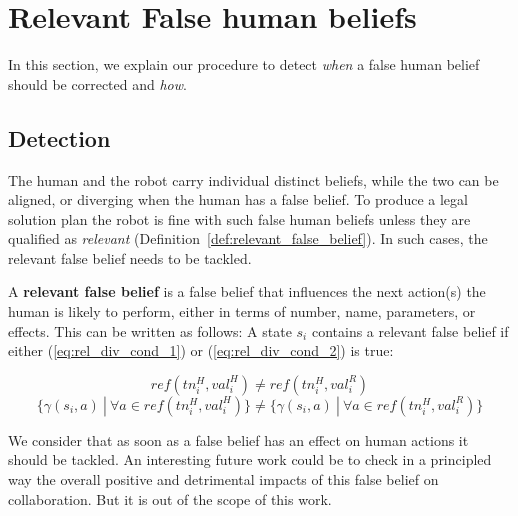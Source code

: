 {%
\section{Relevant False human beliefs}

In this section, we explain our procedure to detect \textit{when} a false human belief should be corrected and \textit{how}.


    \subsection{Detection}

The human and the robot carry individual distinct beliefs, while the two can be aligned, or diverging when the human has a false belief. To produce a legal solution plan the robot is fine with such false human beliefs unless they are qualified as \textit{relevant} (Definition~\ref{def:relevant_false_belief}). In such cases, the relevant false belief needs to be tackled.

\begin{definition} \label{def:relevant_false_belief}

A \textbf{relevant false belief} is a false belief that influences the next action(s) the human is likely to perform, either in terms of number, name, parameters, or effects. This can be written as follows:
A state $s_i$ contains a relevant false belief if either (\ref{eq:rel_div_cond_1}) or (\ref{eq:rel_div_cond_2}) is true:

\begin{equation} \label{eq:rel_div_cond_1}
ref(tn^H_i, val^H_i) \neq ref(tn^H_i, val^R_i)
\end{equation}
\begin{equation} \label{eq:rel_div_cond_2}
\{ \gamma(s_i,a) ~|~ \forall a \in ref( tn^H_i, val^H_i ) \} \neq \{ \gamma(s_i,a) ~|~ \forall a \in ref( tn^H_i, val^R_i ) \}
\end{equation}
\end{definition}

We consider that as soon as a false belief has an effect on human actions it should be tackled. An interesting future work could  be to check in a principled way the overall positive and detrimental impacts of this false belief on collaboration. But it is out of the scope of this work.

}
